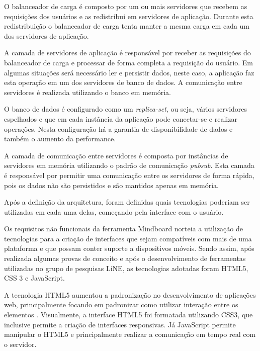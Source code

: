 
O balanceador de carga é composto por um ou mais servidores que recebem as requisições dos usuários e as redistribui em servidores de aplicação. Durante esta redistribuição o balanceador de carga tenta manter a mesma carga em cada um dos servidores de aplicação.

A camada de servidores de aplicação é responsável por receber as requisições do balanceador de carga e processar de forma completa a requisição do usuário. Em algumas situações será necessário ler e persistir dados, neste caso, a aplicação faz esta operação em um dos servidores de banco de dados. A comunicação entre servidores é realizada utilizando o banco em memória.

O banco de dados é configurado como um \emph{replica-set}, ou seja, vários servidores espelhados e que em cada instância da aplicação pode conectar-se e realizar operações. Nesta configuração há a garantia de disponibilidade de dados e também o aumento da performance.

A camada de comunicação entre servidores é composta por instâncias de servidores em memória utilizando o padrão de comunicação \emph{pubsub}. Esta camada é responsável por permitir uma comunicação entre os servidores de forma rápida, pois os dados não são persistidos e são mantidos apenas em memória.

Após a definição da arquitetura, foram definidas quais tecnologias poderiam ser utilizadas em cada uma delas, começando pela interface com o usuário. 

Os requisitos não funcionais da ferramenta Mindboard norteia a utilização de tecnologias para a criação de interfaces que sejam compatíveis com mais de uma plataforma e que possam conter suporte a dispositivos móveis. Sendo assim, após realizada algumas provas de conceito e após o desenvolvimento de ferramentas utilizadas no grupo de pesquisas LiNE, as tecnologias adotadas foram HTML5, CSS 3 e JavaScript.

A tecnologia HTML5 aumentou a padronização no desenvolvimento de aplicações web, principalmente focando em padronizar como utilizar interação entre os elementos \cite{html5}. Visualmente, a interface HTML5 foi formatada utilizando CSS3, que inclusive permite a criação de interfaces responsivas. Já JavaScript permite manipular o HTML5 e principalmente realizar a comunicação em tempo real com o servidor.

